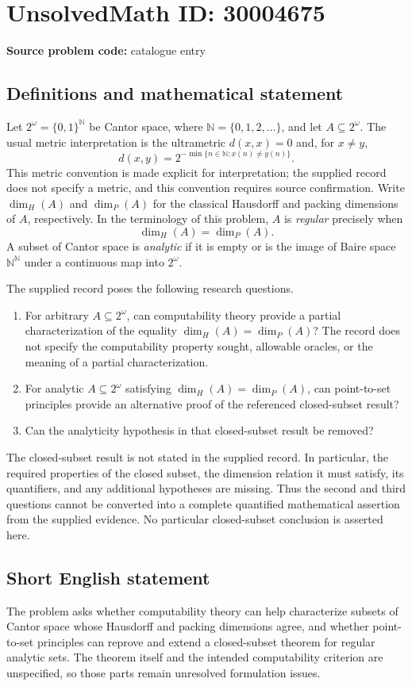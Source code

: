 \documentclass[11pt]{article}
\newcommand{\N}{\mathbb{N}}
\begin{document}
\section*{UnsolvedMath ID: 30004675}
\textbf{Source problem code:} catalogue entry
\subsection{Definitions and mathematical statement}
Let \(2^\omega=\{0,1\}^{\N}\) be Cantor space, where \(\N=\{0,1,2,\ldots\}\), and let \(A\subseteq 2^\omega\). The usual metric interpretation is the ultrametric \(d(x,x)=0\) and, for \(x\ne y\),
\[
 d(x,y)=2^{-\min\{n\in\N:x(n)\ne y(n)\}}.
\]
This metric convention is made explicit for interpretation; the supplied record does not specify a metric, and this convention requires source confirmation. Write \(\dim_H(A)\) and \(\dim_P(A)\) for the classical Hausdorff and packing dimensions of \(A\), respectively. In the terminology of this problem, \(A\) is \emph{regular} precisely when
\[
\dim_H(A)=\dim_P(A).
\]
A subset of Cantor space is \emph{analytic} if it is empty or is the image of Baire space \(\N^\N\) under a continuous map into \(2^\omega\).

The supplied record poses the following research questions.
\begin{enumerate}
\item For arbitrary \(A\subseteq 2^\omega\), can computability theory provide a partial characterization of the equality \(\dim_H(A)=\dim_P(A)\)? The record does not specify the computability property sought, allowable oracles, or the meaning of a partial characterization.
\item For analytic \(A\subseteq 2^\omega\) satisfying \(\dim_H(A)=\dim_P(A)\), can point-to-set principles provide an alternative proof of the referenced closed-subset result?
\item Can the analyticity hypothesis in that closed-subset result be removed?
\end{enumerate}
The closed-subset result is not stated in the supplied record. In particular, the required properties of the closed subset, the dimension relation it must satisfy, its quantifiers, and any additional hypotheses are missing. Thus the second and third questions cannot be converted into a complete quantified mathematical assertion from the supplied evidence. No particular closed-subset conclusion is asserted here.
\subsection{Short English statement}
The problem asks whether computability theory can help characterize subsets of Cantor space whose Hausdorff and packing dimensions agree, and whether point-to-set principles can reprove and extend a closed-subset theorem for regular analytic sets. The theorem itself and the intended computability criterion are unspecified, so those parts remain unresolved formulation issues.
\end{document}

